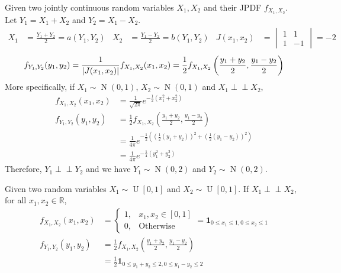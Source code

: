 \documentclass{huhtakm-template-book}
\newcommand{\independent}{\perp\!\!\!\perp}
\DeclareMathOperator{\U}{U}
\DeclareMathOperator{\N}{N}
\begin{document}
    \begin{eg}
        Given two jointly continuous random variables $X_{1},X_{2}$ and their JPDF $f_{X_{1},X_{2}}$.\\
        Let $Y_{1}=X_{1}+X_{2}$ and $Y_{2}=X_{1}-X_{2}$.
        \begin{align*}
            X_{1}&=\frac{Y_{1}+Y_{2}}{2}=a(Y_{1},Y_{2}) & X_{2}&=\frac{Y_{1}-Y_{2}}{2}=b(Y_{1},Y_{2}) & J(x_{1},x_{2})&=\begin{vmatrix}
                1 & 1\\
                1 & -1
            \end{vmatrix}=-2
        \end{align*}
        \begin{equation*}
            f_{Y_{1},Y_{2}}(y_{1},y_{2})=\frac{1}{\left|{J(x_{1},x_{2})}\right|}f_{X_{1},X_{2}}(x_{1},x_{2})=\frac{1}{2}f_{X_{1},X_{2}}\left(\frac{y_{1}+y_{2}}{2},\frac{y_{1}-y_{2}}{2}\right)
        \end{equation*}
        More specifically, if $X_{1}\sim\N(0,1)$, $X_{2}\sim\N(0,1)$ and $X_{1}\independent X_{2}$,
        \begin{align*}
            f_{X_{1},X_{2}}(x_{1},x_{2})&=\frac{1}{\sqrt{2\pi}}e^{-\frac{1}{2}(x_{1}^{2}+x_{2}^{2})}\\
            f_{Y_{1},Y_{2}}(y_{1},y_{2})&=\frac{1}{2}f_{X_{1},X_{2}}\left(\frac{y_{1}+y_{2}}{2},\frac{y_{1}-y_{2}}{2}\right)\\
            &=\frac{1}{4\pi}e^{-\frac{1}{2}\left(\left(\frac{1}{2}(y_{1}+y_{2})\right)^{2}+\left(\frac{1}{2}(y_{1}-y_{2})\right)^{2}\right)}\\
            &=\frac{1}{4\pi}e^{-\frac{1}{4}(y_{1}^{2}+y_{2}^{2})}
        \end{align*}
        Therefore, $Y_{1}\independent Y_{2}$ and we have $Y_{1}\sim\N(0,2)$ and $Y_{2}\sim\N(0,2)$.
    \end{eg}
    \begin{eg}
        Given two random variables $X_{1}\sim\U[0,1]$ and $X_{2}\sim\U[0,1]$. If $X_{1}\independent X_{2}$, for all $x_{1},x_{2}\in\mathbb{R}$,
        \begin{align*}
            f_{X_{1},X_{2}}(x_{1},x_{2})&=\begin{cases}
                1, &x_{1},x_{2}\in[0,1]\\
                0, &\text{Otherwise}
            \end{cases}=\mathbf{1}_{0\leq x_{1}\leq 1,0\leq x_{2}\leq 1}\\
            f_{Y_{1},Y_{2}}(y_{1},y_{2})&=\frac{1}{2}f_{X_{1},X_{2}}\left(\frac{y_{1}+y_{2}}{2},\frac{y_{1}-y_{2}}{2}\right)\\
            &=\frac{1}{2}\mathbf{1}_{0\leq y_{1}+y_{2}\leq 2,0\leq y_{1}-y_{2}\leq 2}
        \end{align*}
    \end{eg}
\end{document}
